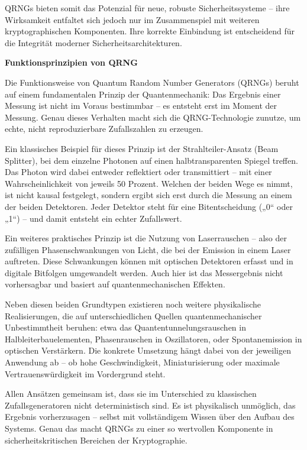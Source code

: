 \noindent
QRNGs bieten somit das Potenzial für neue, robuste Sicherheitssysteme – ihre Wirksamkeit entfaltet sich jedoch nur im Zusammenspiel mit weiteren kryptographischen Komponenten. Ihre korrekte Einbindung ist entscheidend für die Integrität moderner Sicherheitsarchitekturen.


\vspace{1em}
\noindent\textbf{Funktionsprinzipien von QRNG}

\noindent
Die Funktionsweise von Quantum Random Number Generators (QRNGs) beruht auf einem fundamentalen Prinzip der Quantenmechanik: Das Ergebnis einer Messung ist nicht im Voraus bestimmbar – es entsteht erst im Moment der Messung. Genau dieses Verhalten macht sich die QRNG-Technologie zunutze, um echte, nicht reproduzierbare Zufallszahlen zu erzeugen. \cite{herrero-collantes_et_al_quantum_2017}

\noindent
Ein klassisches Beispiel für dieses Prinzip ist der Strahlteiler-Ansatz (Beam Splitter), bei dem einzelne Photonen auf einen halbtransparenten Spiegel treffen. Das Photon wird dabei entweder reflektiert oder transmittiert – mit einer Wahrscheinlichkeit von jeweils 50 Prozent. Welchen der beiden Wege es nimmt, ist nicht kausal festgelegt, sondern ergibt sich erst durch die Messung an einem der beiden Detektoren. Jeder Detektor steht für eine Bitentscheidung („0“ oder „1“) – und damit entsteht ein echter Zufallswert. \cite{jennewein_t_et_al_fast_2000}

\noindent
Ein weiteres praktisches Prinzip ist die Nutzung von Laserrauschen – also der zufälligen Phasenschwankungen von Licht, die bei der Emission in einem Laser auftreten. Diese Schwankungen können mit optischen Detektoren erfasst und in digitale Bitfolgen umgewandelt werden. Auch hier ist das Messergebnis nicht vorhersagbar und basiert auf quantenmechanischen Effekten. \cite{ma_x_et_al_quantum_2016}

\noindent
Neben diesen beiden Grundtypen existieren noch weitere physikalische Realisierungen, die auf unterschiedlichen Quellen quantenmechanischer Unbestimmtheit beruhen: etwa das Quantentunnelungsrauschen in Halbleiterbauelementen, Phasenrauschen in Oszillatoren, oder Spontanemission in optischen Verstärkern. Die konkrete Umsetzung hängt dabei von der jeweiligen Anwendung ab – ob hohe Geschwindigkeit, Miniaturisierung oder maximale Vertrauenswürdigkeit im Vordergrund steht. \cite{herrero-collantes_et_al_quantum_2017}

\noindent
Allen Ansätzen gemeinsam ist, dass sie im Unterschied zu klassischen Zufallsgeneratoren nicht deterministisch sind. Es ist physikalisch unmöglich, das Ergebnis vorherzusagen – selbst mit vollständigem Wissen über den Aufbau des Systems. Genau das macht QRNGs zu einer so wertvollen Komponente in sicherheitskritischen Bereichen der Kryptographie.


